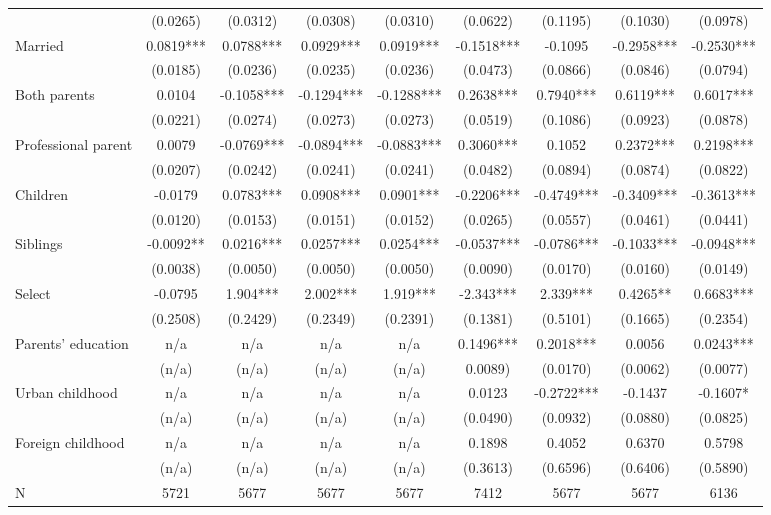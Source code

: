 \documentclass[12pt]{report}
\begin{document}
\begin{sidewaystable}
\begin{tabular}{lc|c|c|c|c|c|c|c}
& (0.0265) & (0.0312) & (0.0308) & (0.0310) & (0.0622) & (0.1195) & (0.1030) & (0.0978)\\
Married & 0.0819*** & 0.0788*** & 0.0929*** & 0.0919*** & -0.1518*** & -0.1095 & -0.2958*** & -0.2530***\\
& (0.0185) & (0.0236) & (0.0235) & (0.0236) & (0.0473) & (0.0866) & (0.0846) & (0.0794)\\
Both parents & 0.0104 & -0.1058*** & -0.1294*** & -0.1288*** & 0.2638*** & 0.7940*** & 0.6119*** & 0.6017***\\
& (0.0221) & (0.0274) & (0.0273) & (0.0273) & (0.0519) & (0.1086) & (0.0923) & (0.0878)\\
Professional parent & 0.0079 & -0.0769*** & -0.0894*** & -0.0883*** & 0.3060*** & 0.1052 & 0.2372*** & 0.2198***\\
& (0.0207) & (0.0242) & (0.0241) & (0.0241) & (0.0482) & (0.0894) & (0.0874) & (0.0822)\\
Children & -0.0179 & 0.0783*** & 0.0908*** & 0.0901*** & -0.2206*** & -0.4749*** & -0.3409*** & -0.3613***\\
& (0.0120) & (0.0153) & (0.0151) & (0.0152) & (0.0265) & (0.0557) & (0.0461) & (0.0441)\\
Siblings & -0.0092** & 0.0216*** & 0.0257*** & 0.0254*** & -0.0537*** & -0.0786*** & -0.1033*** & -0.0948***\\
& (0.0038) & (0.0050) & (0.0050) & (0.0050) & (0.0090) & (0.0170) & (0.0160) & (0.0149)\\
Select & -0.0795 & 1.904*** & 2.002*** & 1.919*** & -2.343*** & 2.339*** & 0.4265** & 0.6683***\\
& (0.2508) & (0.2429) & (0.2349) & (0.2391) & (0.1381) & (0.5101) & (0.1665) & (0.2354)\\
Parents' education & n/a & n/a & n/a & n/a & 0.1496*** & 0.2018*** & 0.0056 & 0.0243***\\
& (n/a) & (n/a) & (n/a) & (n/a) & 0.0089) & (0.0170) & (0.0062) & (0.0077)\\
Urban childhood & n/a & n/a & n/a & n/a & 0.0123 & -0.2722*** & -0.1437 & -0.1607*\\
& (n/a) & (n/a) & (n/a) & (n/a) & (0.0490) & (0.0932) & (0.0880) & (0.0825)\\
Foreign childhood & n/a & n/a & n/a & n/a & 0.1898 & 0.4052 & 0.6370 & 0.5798\\
& (n/a) & (n/a) & (n/a) & (n/a) & (0.3613) & (0.6596) & (0.6406) & (0.5890)\\
\hline
N & 5721 & 5677 & 5677 & 5677 & 7412 & 5677 & 5677 & 6136\\

\end{tabular}
\end{sidewaystable}
\end{document}
